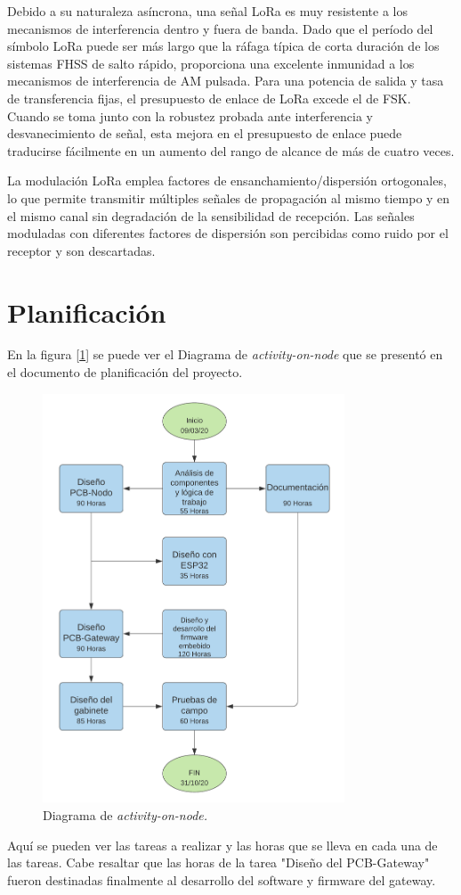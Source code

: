 Debido a su naturaleza asíncrona, una señal LoRa es muy resistente a los mecanismos de interferencia dentro y fuera de banda. Dado que el período del símbolo LoRa  puede ser más largo que la ráfaga típica de corta duración de los sistemas FHSS de salto rápido, proporciona una excelente inmunidad a los mecanismos de interferencia de AM pulsada. Para una potencia de salida y tasa de transferencia fijas, el presupuesto de enlace de LoRa excede el de FSK. Cuando se toma junto con la robustez probada ante interferencia y desvanecimiento de señal, esta mejora en el presupuesto de enlace puede traducirse fácilmente en un aumento del rango de alcance de más de cuatro veces.

La modulación LoRa emplea factores de ensanchamiento/dispersión ortogonales, lo que permite transmitir múltiples señales de propagación al mismo tiempo y en el mismo canal sin degradación de la sensibilidad de recepción. Las señales moduladas con diferentes factores de dispersión son percibidas como ruido por el receptor y son descartadas.

\section{Planificación}

En la figura [\ref{fig:activityonnode}] se puede ver el Diagrama de {\textit{activity-on-node}} que se presentó en el documento de planificación del proyecto.

\begin{figure}[ht!]
	\centering
	\includegraphics[width=0.8\textwidth]{./Figures/activityonnode.png}
	\caption{Diagrama de {\textit{activity-on-node.}}}
	\label{fig:activityonnode}
\end{figure}

Aquí se pueden ver las tareas a realizar y las horas que se lleva en cada una de las tareas. Cabe resaltar que las horas de la tarea "Diseño del PCB-Gateway" fueron destinadas finalmente al desarrollo del software y firmware del gateway.

